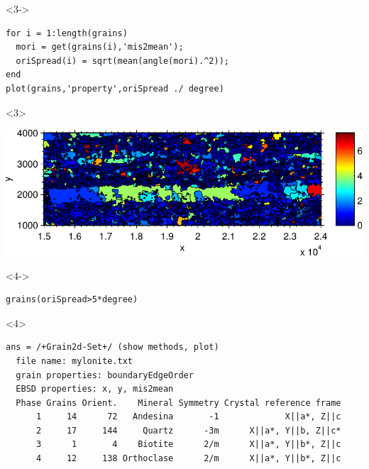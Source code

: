 \documentclass[comptress]{beamer}
\begin{document}
\begin{frame}[fragile]
\begin{overlayarea}{\textwidth}{\textheight}
\begin{onlyenv}
\begin{lstlisting}[style=output]
  \end{lstlisting}
  \end{onlyenv}
  \begin{onlyenv}<3->
    \vspace{-0.3cm}
\begin{lstlisting}[style=input]
for i = 1:length(grains)
  mori = get(grains(i),'mis2mean');
  oriSpread(i) = sqrt(mean(angle(mori).^2));
end
plot(grains,'property',oriSpread ./ degree)
\end{lstlisting}
  \end{onlyenv}
  \begin{onlyenv}<3>
    \centerline{\includegraphics[width=\textwidth]{pic/oriSpread}}
  \end{onlyenv}


  \begin{onlyenv}<4->
    \vspace{-0.3cm}
\begin{lstlisting}[style=input]
grains(oriSpread>5*degree)
\end{lstlisting}
  \end{onlyenv}
  \begin{onlyenv}<4>
\begin{lstlisting}[style=output]
ans = /+Grain2d-Set+/ (show methods, plot)
  file name: mylonite.txt
  grain properties: boundaryEdgeOrder
  EBSD properties: x, y, mis2mean
  Phase Grains Orient.    Mineral Symmetry Crystal reference frame
      1     14      72   Andesina       -1             X||a*, Z||c
      2     17     144     Quartz      -3m      X||a*, Y||b, Z||c*
      3      1       4    Biotite      2/m      X||a*, Y||b*, Z||c
      4     12     138 Orthoclase      2/m      X||a*, Y||b*, Z||c
\end{lstlisting}
  \end{onlyenv}
\end{overlayarea}

\end{frame}
\end{document}
